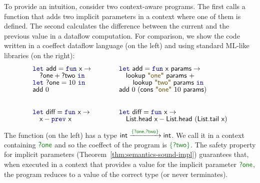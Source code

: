 To provide an intuition, consider two context-aware programs. The first calls a function that
adds two implicit parameters in a context where one of them is defined. The second calculates
the difference between the current and the previous value in a dataflow computation.
For comparison, we show the code written in a coeffect dataflow language (on the left) and
using standard ML-like libraries (on the right):
%
\begin{equation*}
\begin{array}{lcl}
\begin{array}{l}
\kvd{let}~\ident{add}=\kvd{fun}~\ident{x}\rightarrow\\[-0.2em]
 \quad \ident{?one} + \ident{?two}~\kvd{in}\\[-0.2em]
\kvd{let}~\ident{?one} = 10~\kvd{in}\\[-0.2em]
\ident{add}~0
\end{array}
&\quad&
\begin{array}{l}
\kvd{let}~\ident{add}=\kvd{fun}~\ident{x}~\ident{params}\rightarrow\\[-0.2em]
 \quad \ident{lookup}~\str{one}~\ident{params}~+ \\[-0.2em]
 \quad\quad \ident{lookup}~\str{two}~\ident{params}~\kvd{in}\\[-0.2em]
\ident{add}~0~(\ident{cons}~\str{one}~10~\ident{params})
\end{array}
\\[3.5em]
\begin{array}{l}
\kvd{let}~\ident{diff}=\kvd{fun}~\ident{x}\rightarrow\\[-0.2em]
 \quad \ident{x}-\kvd{prev}~\ident{x}
\end{array}
&&
\begin{array}{l}
\kvd{let}~\ident{diff}=\kvd{fun}~\ident{x}\rightarrow\\[-0.2em]
 \quad \ident{List.head}~\ident{x}-\ident{List.head}~(\ident{List.tail}~\ident{x})
\end{array}
\end{array}
\end{equation*}
%
The  function (on the left) has a type $\ident{int}\xrightarrow{\cclrd{ \{ \ident{?one},\ident{?two} \} }}\ident{int}$.
We call it in a context containing $\cclrd{\ident{?one}}$ and so the coeffect of the program is
$\cclrd{ \{ \ident{?two} \} }$. The safety property for implicit parameters
(Theorem~\ref{thm:semantics-sound-impl}) guarantees that, when executed in a context that
provides a value for the implicit parameter $\cclrd{\ident{?one}}$, the program reduces to
a value of the correct type (or never terminates).

